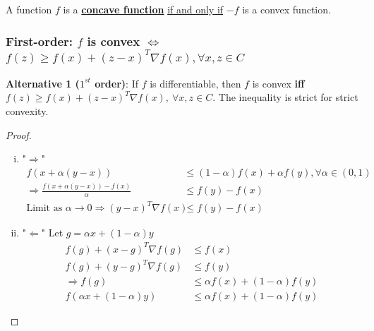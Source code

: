 \documentclass[11pt,a4paper]{article}
\begin{document}
A function $f$ is a \underline{\textbf{concave function}} \underline{if and only if} $-f$ is a convex function.

\subsubsection{First-order: $f$ is convex $\Leftrightarrow$ $f(z) \geq f(x)+(z-x)^{T} \nabla f(x), \forall x, z \in C$}
\textbf{Alternative 1 ($1^{st}$ order)}: If $f$ is differentiable, then $f$ is convex \textbf{iff} $f(z) \geq f(x)+(z-x)^{T} \nabla f(x), \ \forall x, z \in C .$ The inequality is strict for strict convexity.
\begin{proof}
\quad
\begin{enumerate}[(i)]
    \item "$\Rightarrow$" \begin{equation}
        \begin{aligned}
            f(x+\alpha (y-x))&\leq (1-\alpha)f(x)+\alpha f(y), \forall \alpha \in (0,1)\\
            \Rightarrow	\frac{f(x+\alpha(y-x))-f(x)}{\alpha}&\leq f(y)-f(x)\\
            \text{Limit as }\alpha \rightarrow 0 \Rightarrow (y-x)^{T} \nabla f(x)&\leq f(y)-f(x)
        \end{aligned}
        \nonumber
    \end{equation}
    \item "$\Leftarrow$" Let $g=\alpha x+(1-\alpha) y$
    \begin{equation}
        \begin{aligned}
            f(g)+(x-g)^{T} \nabla f(g)&\leq f(x)\\
            f(g)+(y-g)^{T} \nabla f(g)&\leq f(y)\\
            \Rightarrow	f(g)&\leq \alpha f(x)+(1-\alpha)f(y)\\
            f(\alpha x+(1-\alpha) y)&\leq \alpha f(x)+(1-\alpha)f(y)
        \end{aligned}
        \nonumber
    \end{equation}
\end{enumerate}
\end{proof}
\end{document}
